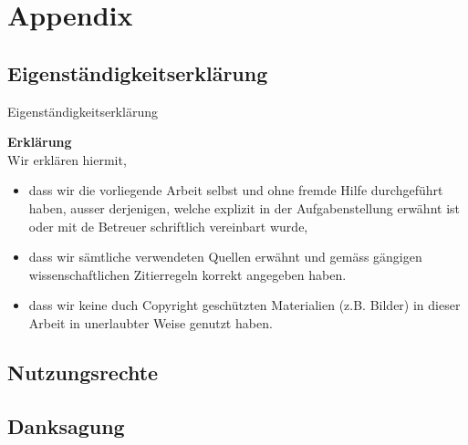 \chapter{Appendix}
\section{Eigenständigkeitserklärung}
Eigenständigkeitserklärung

\vspace{2 cm}

\noindent \textbf{Erklärung} \\
Wir erklären hiermit, \\

\begin{itemize}
    \item dass wir die vorliegende Arbeit selbst und ohne fremde Hilfe durchgeführt haben, ausser derjenigen, welche explizit in der Aufgabenstellung erwähnt ist oder mit de Betreuer schriftlich vereinbart wurde,
    \item dass wir sämtliche verwendeten Quellen erwähnt und gemäss gängigen wissen\-schaftlichen Zitierregeln korrekt angegeben haben.
    \item dass wir keine duch Copyright geschützten Materialien (z.B. Bilder) in dieser Arbeit in unerlaubter Weise genutzt haben.
\end{itemize}

\vspace{2cm}


\vspace{2cm}


\vspace{2cm}


\section{Nutzungsrechte}

\section{Danksagung}
